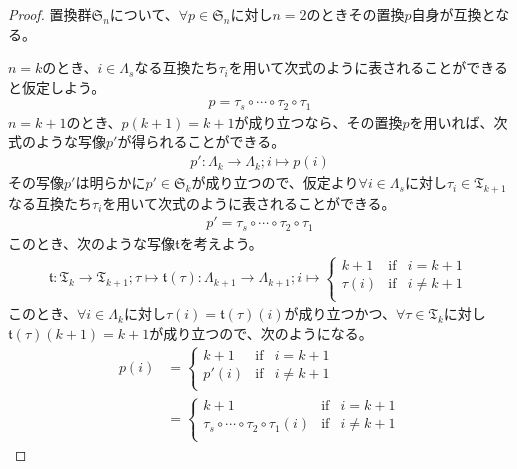 \documentclass[dvipdfmx]{jsarticle}
\begin{document}
\begin{proof}
置換群$\mathfrak{S}_{n}$について、$\forall p \in \mathfrak{S}_{n}$に対し$n = 2$のときその置換$p$自身が互換となる。\par
$n = k$のとき、$i \in \varLambda_{s}$なる互換たち$\tau_{i}$を用いて次式のように表されることができると仮定しよう。
\begin{align*}
p = \tau_{s} \circ \cdots \circ \tau_{2} \circ \tau_{1}
\end{align*}
$n = k + 1$のとき、$p(k + 1) = k + 1$が成り立つなら、その置換$p$を用いれば、次式のような写像$p'$が得られることができる。
\begin{align*}
p':\varLambda_{k} \rightarrow \varLambda_{k};i \mapsto p(i)
\end{align*}
その写像$p'$は明らかに$p' \in \mathfrak{S}_{k}$が成り立つので、仮定より$\forall i \in \varLambda_{s}$に対し$\tau_{i} \in \mathfrak{T}_{k + 1}$なる互換たち$\tau_{i}$を用いて次式のように表されることができる。
\begin{align*}
p' = \tau_{s} \circ \cdots \circ \tau_{2} \circ \tau_{1}
\end{align*}
このとき、次のような写像$\mathfrak{t}$を考えよう。
\begin{align*}
\mathfrak{t:}\mathfrak{T}_{k} \rightarrow \mathfrak{T}_{k + 1};\tau \mapsto \mathfrak{t}(\tau):\varLambda_{k + 1} \rightarrow \varLambda_{k + 1};i \mapsto \left\{ \begin{matrix}
k + 1 & \mathrm{if} & i = k + 1 \\
\tau(i) & \mathrm{if} & i \neq k + 1 \\
\end{matrix} \right.\ 
\end{align*}
このとき、$\forall i \in \varLambda_{k}$に対し$\tau(i) = \mathfrak{t}(\tau)(i)$が成り立つかつ、$\forall\tau \in \mathfrak{T}_{k}$に対し$\mathfrak{t}(\tau)(k + 1) = k + 1$が成り立つので、次のようになる。
\begin{align*}
p(i) &= \left\{ \begin{matrix}
k + 1 & \mathrm{if} & i = k + 1 \\
p'(i) & \mathrm{if} & i \neq k + 1 \\
\end{matrix} \right.\ \\
&= \left\{ \begin{matrix}
k + 1 & \mathrm{if} & i = k + 1 \\
\tau_{s} \circ \cdots \circ \tau_{2} \circ \tau_{1}(i) & \mathrm{if} & i \neq k + 1 \\

\end{matrix}
\end{align*}
\end{proof}
\end{document}
